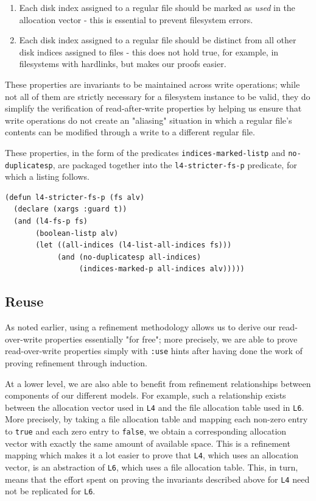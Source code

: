 \documentclass[runningheads,a4paper]{llncs}
\begin{document}
\begin{enumerate}
\item Each disk index assigned to a regular file should be
  marked as \textit{used} in the allocation vector - this is essential
  to prevent filesystem errors.
\item Each disk index assigned to a regular file should be distinct
  from all other disk indices assigned to files - this does not hold
  true, for example, in filesystems with hardlinks, but makes our
  proofs easier.
\end{enumerate}

These properties are invariants to be maintained across
write operations; while not all of them are strictly necessary for a
filesystem instance to be valid, they do simplify the verification of
read-after-write properties by helping us ensure that write operations
do not create an "aliasing" situation in which a regular file's
contents can be modified through a write to a different regular file.

These properties, in the form of the predicates
\texttt{indices-marked-listp} and \texttt{no-duplicatesp}, are
packaged together into the \texttt{l4-stricter-fs-p} predicate, for
which a listing follows.

\medskip

\noindent
\begin{verbatim}
(defun l4-stricter-fs-p (fs alv)
  (declare (xargs :guard t))
  (and (l4-fs-p fs)
       (boolean-listp alv)
       (let ((all-indices (l4-list-all-indices fs)))
            (and (no-duplicatesp all-indices)
                 (indices-marked-p all-indices alv)))))
\end{verbatim}

\subsection{Reuse}

As noted earlier, using a refinement methodology allows us to derive
our read-over-write properties essentially "for free"; more precisely,
we are able to prove read-over-write properties simply with
\texttt{:use} hints after having done the work of proving refinement
through induction.

At a lower level, we are also able to benefit from refinement
relationships between components of our different models. For example,
such a relationship exists between the allocation vector used in
\texttt{L4} and the file allocation table used in \texttt{L6}. More
precisely, by taking a file allocation table and mapping each non-zero
entry to \texttt{true} and each zero entry to \texttt{false}, we
obtain a corresponding allocation vector with exactly the same amount
of available space. This is a refinement mapping which makes it a lot
easier to prove that \texttt{L4}, which uses an allocation vector, is
an abstraction of \texttt{L6}, which uses a file allocation
table. This, in turn, means that the effort spent on proving the
invariants described above for \texttt{L4} need not be replicated for
\texttt{L6}.
\end{document}

